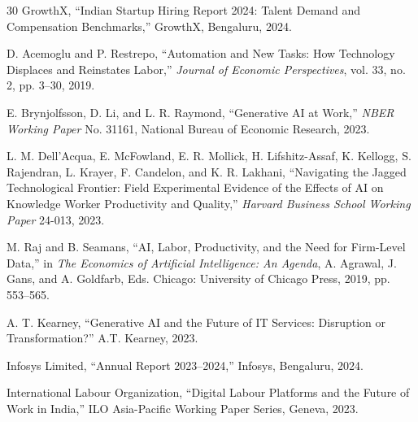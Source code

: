 \documentclass[conference]{IEEEtran}
\begin{document}
\begin{thebibliography}{30}
GrowthX,
``Indian Startup Hiring Report 2024: Talent Demand and Compensation Benchmarks,''
GrowthX, Bengaluru, 2024.

D. Acemoglu and P. Restrepo,
``Automation and New Tasks: How Technology Displaces and Reinstates Labor,''
\textit{Journal of Economic Perspectives}, vol. 33, no. 2, pp. 3--30, 2019.

E. Brynjolfsson, D. Li, and L. R. Raymond,
``Generative AI at Work,''
\textit{NBER Working Paper} No. 31161, National Bureau of Economic Research, 2023.

L. M. Dell'Acqua, E. McFowland, E. R. Mollick, H. Lifshitz-Assaf, K. Kellogg, S. Rajendran, L. Krayer, F. Candelon, and K. R. Lakhani,
``Navigating the Jagged Technological Frontier: Field Experimental Evidence of the Effects of AI on Knowledge Worker Productivity and Quality,''
\textit{Harvard Business School Working Paper} 24-013, 2023.

M. Raj and B. Seamans,
``AI, Labor, Productivity, and the Need for Firm-Level Data,''
in \textit{The Economics of Artificial Intelligence: An Agenda},
A. Agrawal, J. Gans, and A. Goldfarb, Eds.
Chicago: University of Chicago Press, 2019, pp. 553--565.

A. T. Kearney,
``Generative AI and the Future of IT Services: Disruption or Transformation?''
A.T. Kearney, 2023.

Infosys Limited,
``Annual Report 2023--2024,''
Infosys, Bengaluru, 2024.

International Labour Organization,
``Digital Labour Platforms and the Future of Work in India,''
ILO Asia-Pacific Working Paper Series, Geneva, 2023.

\end{thebibliography}
\end{document}
